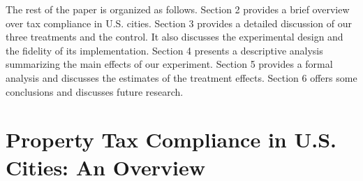 \documentclass[12pt,titlepage]{article}
\begin{document}
The rest of the paper is organized as follows.  Section 2 provides a
brief overview over tax compliance in U.S. cities. Section 3 provides
a detailed discussion of our three treatments and the control. It also
discusses the experimental design and the fidelity of its
implementation. Section 4 presents a descriptive analysis summarizing
the main effects of our experiment.  Section 5 provides a formal
analysis and discusses the estimates of the treatment effects.
Section 6 offers some conclusions and discusses future research.



\section{Property Tax Compliance in U.S. Cities: An Overview}
\end{document}
